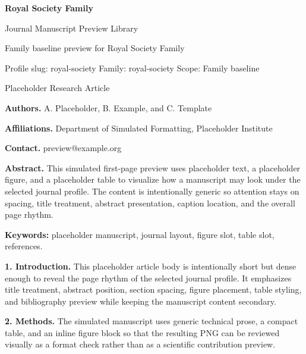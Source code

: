 \documentclass[10pt,a4paper]{article}
\begin{document}
\begin{center}
{\LARGE\bfseries Royal Society Family}\par
\vspace{0.25em}
{\small Journal Manuscript Preview Library}\par
\vspace{0.15em}
{\footnotesize Family baseline preview for Royal Society Family}\par
\vspace{0.2em}
{\footnotesize Profile slug: royal-society \quad Family: royal-society \quad Scope: Family baseline}
\end{center}
\vspace{0.2em}
 Placeholder Research Article\par\vspace{0.4em}


\noindent\textbf{Authors.} A. Placeholder, B. Example, and C. Template\par
\noindent\textbf{Affiliations.} Department of Simulated Formatting, Placeholder Institute\par
\noindent\textbf{Contact.} preview@example.org\par
\vspace{0.4em}
\noindent\textbf{Abstract.} This simulated first-page preview uses placeholder text, a placeholder figure, and a placeholder table to visualize how a manuscript may look under the selected journal profile. The content is intentionally generic so attention stays on spacing, title treatment, abstract presentation, caption location, and the overall page rhythm.\par\vspace{0.6em}
\noindent\textbf{Keywords:} placeholder manuscript, journal layout, figure slot, table slot, references.\par\vspace{0.6em}


\small
\textbf{1. Introduction.} This placeholder article body is intentionally short but dense enough to reveal the page rhythm of the selected journal profile. It emphasizes title treatment, abstract position, section spacing, figure placement, table styling, and bibliography preview while keeping the manuscript content secondary.

\textbf{2. Methods.} The simulated manuscript uses generic technical prose, a compact table, and an inline figure block so that the resulting PNG can be reviewed visually as a format check rather than as a scientific contribution preview.
\end{document}
